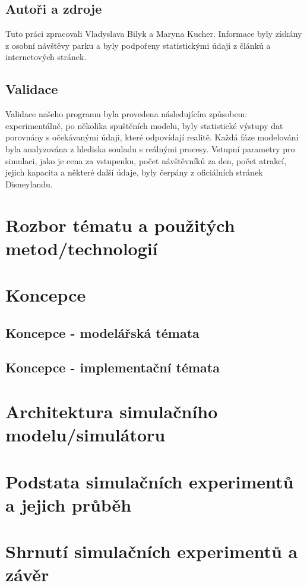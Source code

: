 \documentclass[a4paper,12pt]{article}
\begin{document}
\subsection{Autoři a zdroje}
Tuto práci zpracovali Vladyslava Bilyk a Maryna Kucher. Informace byly získány z osobní návštěvy parku a byly podpořeny statistickými údaji z článků a internetových stránek.

\subsection{Validace}
Validace našeho programu byla provedena následujícím způsobem: experimentálně, po několika spuštěních modelu, byly statistické výstupy dat porovnány s očekávanými údaji, které odpovídají realitě. Každá fáze modelování byla analyzována z hlediska souladu s reálnými procesy. Vstupní parametry pro simulaci, jako je cena za vstupenku, počet návštěvníků za den, počet atrakcí, jejich kapacita a některé další údaje, byly čerpány z oficiálních stránek Disneylandu.

\section{Rozbor tématu a použitých metod/technologií}

\section{Koncepce}
\subsection{Koncepce - modelářská témata}
\subsection{Koncepce - implementační témata}

\section{Architektura simulačního modelu/simulátoru}

\section{Podstata simulačních experimentů a jejich průběh}

\section{Shrnutí simulačních experimentů a závěr}

 
\end{document}
